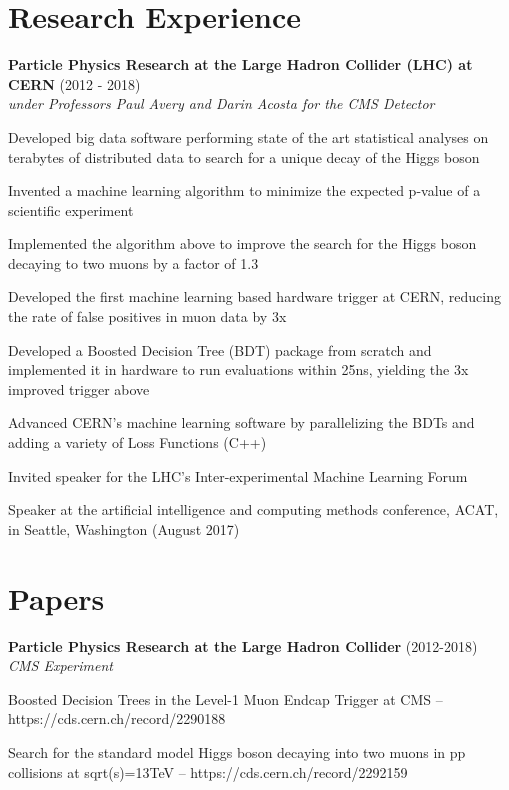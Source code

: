 \begin{resume}
    \section{\mysidestyle Research Experience}
    {\bf Particle Physics Research at the Large Hadron Collider (LHC) at CERN} (2012 - 2018)\\\vspace{2mm}%
    \textit{under Professors Paul Avery and Darin Acosta for the CMS Detector}
    \begin{stuff}
        \vspace*{1mm}
                \item Developed big data software performing state of the art statistical analyses on terabytes of distributed data to search for a unique decay of the Higgs boson
                \item Invented a machine learning algorithm to minimize the expected p-value of a scientific experiment
                \vspace*{16mm} 
                \item Implemented the algorithm above to improve the search for the Higgs boson decaying to two muons by a factor of 1.3 
                \item Developed the first machine learning based hardware trigger at CERN, reducing the rate of false positives in muon data by 3x
                \item Developed a Boosted Decision Tree (BDT) package from scratch and implemented it in hardware to run evaluations within 25ns, yielding the 3x improved trigger above
                \item Advanced CERN's machine learning software by parallelizing the BDTs and adding a variety of Loss Functions (C++)
                \item Invited speaker for the LHC's Inter-experimental Machine Learning Forum
                \item Speaker at the artificial intelligence and computing methods conference, ACAT, in Seattle, Washington (August 2017)
                                           
    \end{stuff}
    \section{\mysidestyle Papers}
    {\bf Particle Physics Research at the Large Hadron Collider} (2012-2018)\\\vspace{2mm}%
    \textit{CMS Experiment}
    \begin{stuff}
        \vspace*{1mm}
                \item Boosted Decision Trees in the Level-1 Muon Endcap Trigger at CMS -- \\\relax https://cds.cern.ch/record/2290188
                \item Search for the standard model Higgs boson decaying into two muons in pp collisions at sqrt(s)=13TeV -- https://cds.cern.ch/record/2292159
    \end{stuff}


\end{resume}
